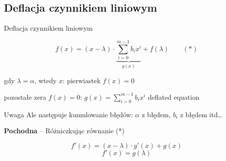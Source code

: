 \subsection{Deflacja czynnikiem liniowym}

\begin{frame}{Deflacja czynnikiem liniowym}
  \begin{block}{}
    $$ f(x) = (x - \lambda) \cdot \underbrace{\sum_{i=0}^{m-1} b_i x^i}_{g(x)} + f(\lambda) \qquad (*) $$
  \end{block}
  gdy $ \lambda = \alpha $, wtedy $x$: pierwiastek $ f(x) = 0 $

  \vspace{5px}

  pozostałe zera $f(x) = 0$: $ g(x) = \sum_{i=0}^{m-1} b_i x^i $ \qquad deflated equation

  \vspace{5px}

  \begin{alertblock}{Uwaga}
    Ale następuje kumulowanie błędów: $\alpha$ z błędem, $b_i$ z błędem itd\dots
  \end{alertblock}
\end{frame}

\begin{frame}
  \textbf{Pochodna} -- Różniczkując równanie (*)

  $$ f'(x) = (x - \lambda) \cdot g'(x) + g(x) $$
  $$ f'(x) = g(\lambda) $$
\end{frame}
